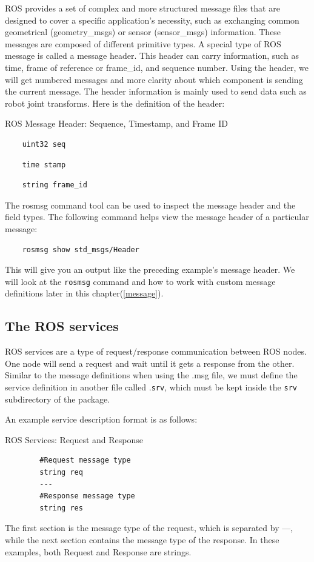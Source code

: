 \documentclass[../../main]{subfiles}
\begin{document}
ROS provides a set of complex and more structured message files that are designed to cover a specific application's necessity, such as exchanging common geometrical (geometry\_msgs) or sensor (sensor\_msgs) information. These messages are composed of different primitive types. A special type of ROS message is called a message header. This header can carry information, such as time, frame of reference or frame\_id, and sequence number. Using the header, we will get numbered messages and more clarity about which component is sending the current message. The header information is mainly used to send data such as robot joint transforms. Here is the definition of the header:
\begin{codebox}[]{ROS Message Header: Sequence, Timestamp, and Frame ID}
\begin{verbatim}
    uint32 seq
\end{verbatim}
\begin{verbatim}
    time stamp
\end{verbatim}
\begin{verbatim}
    string frame_id
\end{verbatim}
\end{codebox}

The rosmsg command tool can be used to inspect the message header and the field types.
The following command helps view the message header of a particular message:
\begin{verbatim}
    rosmsg show std_msgs/Header
\end{verbatim}
This will give you an output like the preceding example's message header. We will look
at the \texttt{rosmsg} command and how to work with custom message definitions later in this
chapter(\cref{message}).

\subsection{The ROS services}
ROS services are a type of request/response communication between ROS nodes. One node will send a request and wait until it gets a response from the other. Similar to the message definitions when using the .msg file, we must define the service definition in another file called .\texttt{srv}, which must be kept inside the \texttt{srv} subdirectory of the package.

An example service description format is as follows:

\begin{codebox}[]{ROS Services: Request and Response}
    
    \begin{verbatim}
        #Request message type
        string req
        ---
        #Response message type
        string res
    \end{verbatim}
    \end{codebox}
The first section is the message type of the request, which is separated by ---, while the
next section contains the message type of the response. In these examples, both Request
and Response are strings.
\end{document}
